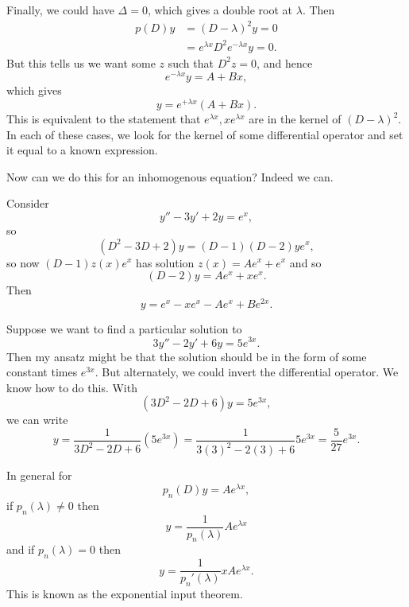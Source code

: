 Finally, we could have $\Delta =0$, which gives a double root at $\lambda$. Then
\begin{align*}
    p(D)y&= (D-\lambda)^2 y =0\\
        &= e^{\lambda x}D^2 e^{-\lambda x} y=0.
\end{align*}
But this tells us we want some $z$ such that $D^2 z=0$, and hence
\begin{equation}
     e^{-\lambda x} y = A + Bx,
\end{equation}
which gives
\begin{equation}
    y= e^{+\lambda x} (A +Bx).
\end{equation}
This is equivalent to the statement that $e^{\lambda x}, xe^{\lambda x}$ are in the kernel of $(D-\lambda)^2$.
In each of these cases, we look for the kernel of some differential operator and set it equal to a known expression.

Now can we do this for an inhomogenous equation? Indeed we can.
\begin{exm}
Consider
\begin{equation}
    y'' - 3y' + 2y = e^x,
\end{equation}
so
\begin{equation}
    (D^2-3D +2) y = (D-1)(D-2) y e^x,
\end{equation}
so now $(D-1)z(x) e^x$ has solution $z(x) = Ae^x + e^x$ and so
\begin{equation}
    (D-2)y = Ae^x + xe^x.
\end{equation}
Then
\begin{equation}
    y= e^x - xe^x -Ae^x + Be^{2x}.
\end{equation}
\end{exm}

\begin{exm}
Suppose we want to find a particular solution to
\begin{equation}
    3y''-2y' + 6y = 5e^{3x}.
\end{equation}
Then my ansatz might be that the solution should be in the form of some constant times $e^{3x}$. But alternately, we could invert the differential operator. We know how to do this. With
\begin{equation}
    (3D^2 -2D +6) y =5e^{3x},
\end{equation}
we can write
\begin{equation}
    y=\frac{1}{3D^2-2D + 6} (5e^{3x}) = \frac{1}{3(3)^2 - 2(3) + 6} 5e^{3x} =\frac{5}{27}e^{3x}.
\end{equation}
\end{exm}
In general for
\begin{equation}
    p_n(D) y = Ae^{\lambda x},
\end{equation}
if $p_n(\lambda) \neq 0$ then 
\begin{equation}
    y=\frac{1}{p_n(\lambda)} Ae^{\lambda x}    
\end{equation}
and if $p_n(\lambda)=0$ then 
\begin{equation}
    y=\frac{1}{p_n'(\lambda)}x Ae^{\lambda x}.
\end{equation}
This is known as the exponential input theorem.

